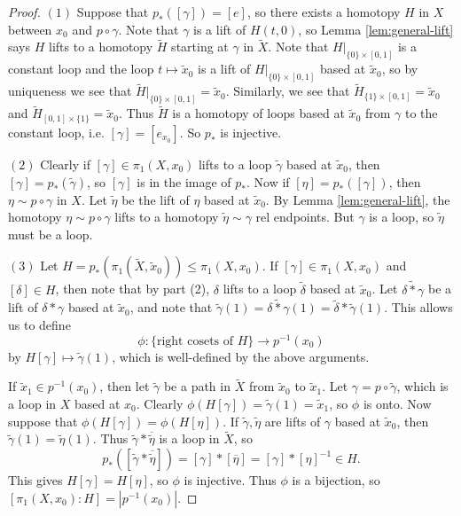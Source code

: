 \begin{proof}
  $(1)$ Suppose that $p_*([\gamma]) = [e]$, so
  there exists a homotopy $H$ in $X$ between $x_0$ and
  $p \circ \gamma$. Note that $\gamma$ is a lift
  of $H(t, 0)$, so Lemma \ref{lem:general-lift} says
  $H$ lifts to a homotopy $\widetilde{H}$ starting
  at $\gamma$ in $\widetilde{X}$.
  Note that $H|_{\{0\} \times [0, 1]}$ is a constant
  loop and the loop $t \mapsto \widetilde{x}_0$ is a
  lift of $H|_{\{0\} \times [0, 1]}$ based at
  $\widetilde{x}_0$, so by uniqueness we see that
  $\widetilde{H}|_{\{0\} \times [0, 1]} = \widetilde{x}_0$.
  Similarly, we see that
  $\widetilde{H}_{\{1\} \times [0, 1]} = \widetilde{x}_0$
  and $\widetilde{H}_{[0, 1] \times \{1\}} = \widetilde{x}_0$.
  Thus $\widetilde{H}$ is a homotopy of loops based
  at $\widetilde{x}_0$ from $\gamma$ to the constant
  loop, i.e. $[\gamma] = [e_{x_0}]$. So
  $p_*$ is injective.

  $(2)$ Clearly if $[\gamma] \in \pi_1(X, x_0)$ lifts
  to a loop $\widetilde{\gamma}$ based at
  $\widetilde{x}_0$, then $[\gamma] = p_*(\widetilde{\gamma})$, so
  $[\gamma]$ is in the image of $p_*$. Now if
  $[\eta] = p_*([\gamma])$, then
  $\eta \sim p \circ \gamma$ in $X$. Let
  $\widetilde{\eta}$ be the lift of $\eta$ based
  at $\widetilde{x}_0$. By Lemma \ref{lem:general-lift},
  the homotopy $\eta \sim p \circ \gamma$ lifts
  to a homotopy $\widetilde{\eta} \sim \gamma$ rel
  endpoints. But $\gamma$ is a loop, so
  $\widetilde{\eta}$ must be a loop.

  $(3)$ Let $H = p_*(\pi_1(\widetilde{X}, \widetilde{x}_0)) \le \pi_1(X, x_0)$.
  If $[\gamma] \in \pi_1(X, x_0)$ and
  $[\delta] \in H$, then note that by part (2),
  $\delta$ lifts to a loop $\widetilde{\delta}$ based
  at $\widetilde{x}_0$. Let $\widetilde{\delta * \gamma}$
  be a lift of $\delta * \gamma$ based at
  $\widetilde{x}_0$, and note that
  $\widetilde{\gamma}(1) = \widetilde{\delta * \gamma}(1)
  = \widetilde{\delta} * \widetilde{\gamma}(1)$.
  This allows us to define
  \[
    \phi : \{\text{right cosets of $H$}\} \to p^{-1}(x_0)
  \]
  by $H[\gamma] \mapsto \widetilde{\gamma}(1)$, which
  is well-defined by the above arguments.

  If $\widetilde{x}_1 \in p^{-1}(x_0)$, then let
  $\widetilde{\gamma}$ be a path in $\widetilde{X}$
  from $\widetilde{x}_0$ to $\widetilde{x}_1$. Let
  $\gamma = p \circ \widetilde{\gamma}$, which is
  a loop in $X$ based at $x_0$. Clearly
  $\phi(H[\gamma]) = \widetilde{\gamma}(1) = \widetilde{x}_1$,
  so $\phi$ is onto.
  Now suppose that
  $\phi(H[\gamma]) = \phi(H[\eta])$. If
  $\widetilde{\gamma}, \widetilde{\eta}$ are
  lifts of $\gamma$ based at $\widetilde{x}_0$, then
  $\widetilde{\gamma}(1) = \widetilde{\eta}(1)$.
  Thus $\widetilde{\gamma} * \overline{\widetilde{\eta}}$
  is a loop in $\widetilde{X}$, so
  \[
    p_*([\widetilde{\gamma} * \overline{\widetilde{\eta}}])
    = [\gamma] * [\overline{\eta}]
    = [\gamma] * [\eta]^{-1} \in H.
  \]
  This gives $H[\gamma] = H[\eta]$, so $\phi$ is injective.
  Thus $\phi$ is a bijection, so
  $[\pi_1(X, x_0) : H] = |p^{-1}(x_0)|$.
\end{proof}

